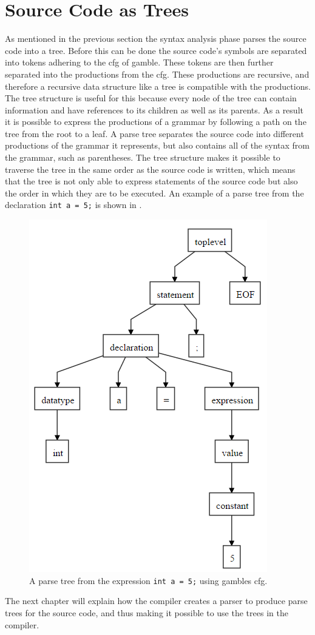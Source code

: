\section{Source Code as Trees}\label{SourceCodeAsTrees}
As mentioned in the previous section the syntax analysis phase parses the source code into a tree.
Before this can be done the source code's symbols are separated into tokens adhering to the \acrshort{cfg} of \gls{gamble}.
These tokens are then further separated into the productions from the \acrshort{cfg}. 
These productions are recursive, and therefore a recursive data structure like a tree is compatible with the productions.
The tree structure is useful for this because every node of the tree can contain information and have references to its children as well as its parents. 
As a result it is possible to express the productions of a grammar by following a path on the tree from the root to a leaf.
A parse tree separates the source code into different productions of the grammar it represents, but also contains all of the syntax from the grammar, such as parentheses.
The tree structure makes it possible to traverse the tree in the same order as the source code is written, which means that the tree is not only able to express statements of the source code but also the order in which they are to be executed.
An example of a parse tree from the declaration \texttt{int a = 5;} is shown in .

\begin{figure}[ht]
    \centering
    \includegraphics[width=0.5\linewidth]{figures/Trees/PST.PNG}
    \caption{A parse tree from the expression \texttt{int a = 5;} using \glspl{gamble} \acrshort{cfg}.}\label{image:PST}
\end{figure}

The next chapter will explain how the compiler creates a parser to produce parse trees for the source code, and thus making it possible to use the trees in the compiler.
